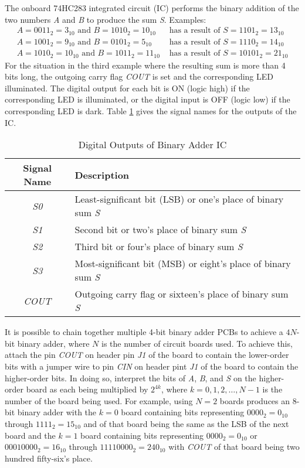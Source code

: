 \documentclass[11pt,oneside]{article}
\begin{document}
The onboard 74HC283 integrated circuit (IC) performs the binary addition of the two numbers \textit{A} and \textit{B} to produce the sum \textit{S}. Examples:
\begin{align*}
	A = 0011_{2} = 3_{10} \text{ and } B = 1010_{2} = 10_{10} &\text{ has a result of } S = 1101_{2} = 13_{10} \\
	A = 1001_{2} = 9_{10} \text{ and } B = 0101_{2} = 5_{10} &\text{ has a result of } S = 1110_{2} = 14_{10} \\
	A = 1010_{2} = 10_{10} \text{ and } B = 1011_{2} = 11_{10} &\text{ has a result of } S = 10101_{2} = 21_{10}
\end{align*}
For the situation in the third example where the resulting sum is more than 4 bits long, the outgoing carry flag \textit{COUT} is set and the corresponding LED illuminated. The digital output for each bit is ON (logic high) if the corresponding LED is illuminated, or the digital input is OFF (logic low) if the corresponding LED is dark. Table \ref{tab:dig_output} gives the signal names for the outputs of the IC.

\begin{table}[!htb]
	\centering
	\caption{Digital Outputs of Binary Adder IC}
	\begin{tabular}{c | l}
		\hline
		Signal Name & Description \\
		\hline
		\textit{S0} & Least-significant bit (LSB) or one's place of binary sum \textit{S} \\
		\textit{S1} & Second bit or two's place of binary sum \textit{S} \\
		\textit{S2} & Third bit or four's place of binary sum \textit{S} \\
		\textit{S3} & Most-significant bit (MSB) or eight's place of binary sum \textit{S}  \\
		\textit{COUT} & Outgoing carry flag or sixteen's place of binary sum \textit{S} \\
		\hline
	\end{tabular}
	\label{tab:dig_output}
\end{table}

It is possible to chain together multiple 4-bit binary adder PCBs to achieve a $4N$-bit binary adder, where $N$ is the number of circuit boards used. To achieve this, attach the pin \textit{COUT} on header pin \textit{J1} of the board to contain the lower-order bits with a jumper wire to pin \textit{CIN} on header pint \textit{J1} of the board to contain the higher-order bits. In doing so, interpret the bits of \textit{A}, \textit{B}, and \textit{S} on the higher-order board as each being multiplied by $2^{4k}$, where $k = 0, 1, 2, \ldots, N - 1$ is the number of the board being used. For example, using $N = 2$ boards produces an 8-bit binary adder with the $k = 0$ board containing bits representing $0000_{2} = 0_{10}$ through $1111_{2} = 15_{10}$ and  of that board being the same as the LSB of the next board and the $k = 1$ board containing bits representing $0000_{2} = 0_{10}$ or $0001 0000_{2} = 16_{10}$ through $1111 0000_{2} = 240_{10}$ with \textit{COUT} of that board being two hundred fifty-six's place.
\end{document}
